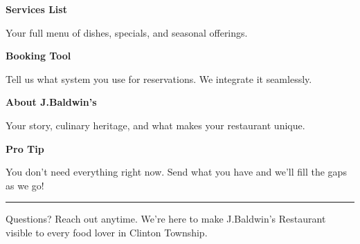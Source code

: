 \documentclass[11pt,letterpaper]{article}
\begin{document}
\begin{minipage}[t]{0.48\textwidth}
\begin{tcolorbox}[colframe=accent-teal, boxrule=1pt, left=0.7em, right=0.7em, top=0.5em, bottom=0.5em, arc=4pt, boxsep=0pt]
{\bfseries\small\color{accent-teal}Services List}

\vspace{0.15em}

{\small Your full menu of dishes, specials, and seasonal offerings.}
\end{tcolorbox}

\vspace{0.1em}

\begin{tcolorbox}[colframe=accent-teal, boxrule=1pt, left=0.7em, right=0.7em, top=0.5em, bottom=0.5em, arc=4pt, boxsep=0pt]
{\bfseries\small\color{accent-teal}Booking Tool}

\vspace{0.15em}

{\small Tell us what system you use for reservations. We integrate it seamlessly.}
\end{tcolorbox}

\vspace{0.1em}

\begin{tcolorbox}[colframe=accent-teal, boxrule=1pt, left=0.7em, right=0.7em, top=0.5em, bottom=0.5em, arc=4pt, boxsep=0pt]
{\bfseries\small\color{accent-teal}About J.Baldwin's}

\vspace{0.15em}

{\small Your story, culinary heritage, and what makes your restaurant unique.}
\end{tcolorbox}

\vspace{-0.2em}
\end{minipage}

\vspace{0.15em}

\begin{tcolorbox}[colback={accent-red!5}, colframe=accent-red!20, boxrule=0.5pt, left=0.7em, right=0.7em, top=0.4em, bottom=0.4em, arc=6pt, boxsep=0pt]

{\bfseries\small\color{accent-red}Pro Tip}

\vspace{0.1em}

{\small You don't need everything right now. Send what you have and we'll fill the gaps as we go!}

\end{tcolorbox}

\vspace{0.15em}

\noindent\hrule
\vspace{0.2em}

{\small\color{text-light}Questions? Reach out anytime. We're here to make J.Baldwin's Restaurant visible to every food lover in Clinton Township.}
\end{document}
